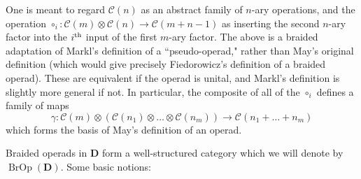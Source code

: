 \documentclass[12pt]{article}
\DeclareMathOperator{\BrOp}{BrOp}
\newcommand{\CC} {\mathcal{C}}
\newcommand{\bD} {\mathbf{D}}
\newcommand{\nth}{\textsuperscript{th}}
\theoremstyle{plain}
\theoremstyle{definition}
\theoremstyle{remark}
\begin{document}
One is meant to regard $\CC(n)$ as an abstract family of $n$-ary operations, and the operation $\circ_i: \CC(m) \otimes \CC(n) \to \CC(m+n-1)$ as inserting the second $n$-ary factor into the $i\nth$ input of the first $m$-ary factor.  The above is a braided adaptation of Markl's definition \cite{markl} of a ``pseudo-operad," rather than May's original definition \cite{may} (which would give precisely Fiedorowicz's definition of a braided operad).  These are equivalent if the operad is unital, and Markl's definition is slightly more general if not.  In particular, the composite of all of the $\circ_i$ defines a family of maps
%
$$\gamma: \CC(m) \otimes \left( \CC(n_1) \otimes \dots \otimes \CC(n_m)\right) \to \CC(n_1 + \dots + n_m)$$
%
which forms the basis of May's definition of an operad.

Braided operads in $\bD$ form a well-structured category which we will denote by $\BrOp(\bD)$.  Some basic notions:
\end{document}
